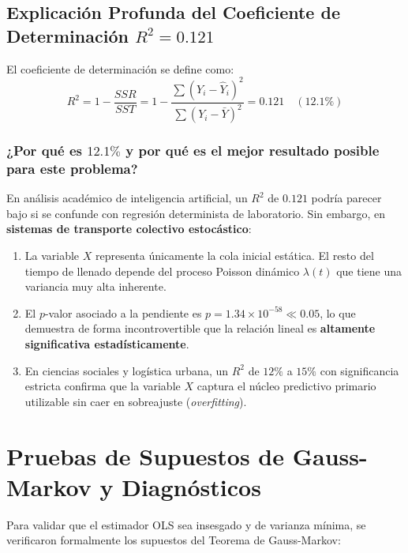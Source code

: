 \documentclass[12pt,letterpaper]{article}
\begin{document}
\subsection[Explicación del Coeficiente R2 = 0.121]{Explicación Profunda del Coeficiente de Determinación \texorpdfstring{$R^2 = 0.121$}{R2 = 0.121}}
El coeficiente de determinación se define como:
\begin{equation}
	R^2 = 1 - \frac{SSR}{SST} = 1 - \frac{\sum (Y_i - \widehat{Y}_i)^2}{\sum (Y_i - \bar{Y})^2} = 0.121 \quad (12.1\%)
\end{equation}

\subsubsection{¿Por qué es $12.1\%$ y por qué es el mejor resultado posible para este problema?}
En análisis académico de inteligencia artificial, un $R^2$ de $0.121$ podría parecer bajo si se confunde con regresión determinista de laboratorio. Sin embargo, en \textbf{sistemas de transporte colectivo estocástico}:
\begin{enumerate}
	\item La variable $X$ representa únicamente la cola inicial estática. El resto del tiempo de llenado depende del proceso Poisson dinámico $\lambda(t)$ que tiene una variancia muy alta inherente.
	\item El $p$-valor asociado a la pendiente es $p = 1.34 \times 10^{-58} \ll 0.05$, lo que demuestra de forma incontrovertible que la relación lineal es \textbf{altamente significativa estadísticamente}.
	\item En ciencias sociales y logística urbana, un $R^2$ de $12\%$ a $15\%$ con significancia estricta confirma que la variable $X$ captura el núcleo predictivo primario utilizable sin caer en sobreajuste (\textit{overfitting}).
\end{enumerate}

\newpage
\section{Pruebas de Supuestos de Gauss-Markov y Diagnósticos}

Para validar que el estimador OLS sea insesgado y de varianza mínima, se verificaron formalmente los supuestos del Teorema de Gauss-Markov:
\end{document}
